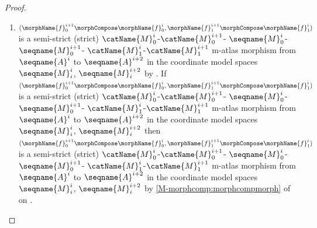 \documentclass{article}
\begin{document}
\begin{lemma}
\begin{proof}
\begin{enumerate}
\item
$
  (
    \morphName{f}^{i+1}_0 \morphCompose \morphName{f}^i_0,
    \morphName{f}^{i+1}_1 \morphCompose \morphName{f}^i_1
  )
$
is a semi-strict (strict)
$\catName{M}^i_0$-$\catName{M}^{i+1}_0$-%
$\seqname{M}^i_0$-$\seqname{M}^{i+1}_0$-%
$\catName{M}^i_1$-$\catName{M}^{i+1}_1$ m-atlas morphism from
$\seqname{A}^i$ to $\seqname{A}^{i+2}$ in the coordinate model spaces
$\seqname{M}^i_i$, $\seqname{M}^{i+2}_i$ by
.
If
$
  (
    \morphName{f}^{i+1}_0 \morphCompose \morphName{f}^i_0,
    \morphName{f}^{i+1}_1 \morphCompose \morphName{f}^i_1
  )
$
is a semi-strict (strict)
$\catName{M}^i_0$-$\catName{M}^{i+1}_0$-%
$\seqname{M}^i_0$-$\seqname{M}^{i+1}_0$-%
$\catName{M}^i_1$-$\catName{M}^{i+1}_1$
m-atlas morphism from $\seqname{A}^i$ to $\seqname{A}^{i+2}$ in the
coordinate model spaces $\seqname{M}^i_i$, $\seqname{M}^{i+2}_i$ then
$
  (
    \morphName{f}^{i+1}_0 \morphCompose \morphName{f}^i_0,
    \morphName{f}^{i+1}_1 \morphCompose \morphName{f}^i_1
  )
$
is a semi-strict (strict)
$\catName{M}^i_0$-$\catName{M}^{i+1}_0$-%
$\seqname{M}^i_0$-$\seqname{M}^{i+1}_0$-%
$\catName{M}^i_1$-$\catName{M}^{i+1}_1$
m-atlas morphism from $\seqname{A}^i$ to $\seqname{A}^{i+2}$ in the
coordinate model spaces $\seqname{M}^i_i$, $\seqname{M}^{i+2}_i$ by
\cref{M-morphcomp:morphcompmorph} of
{
  \showlabelsinline
   on
  .
}
\end{enumerate}
\end{proof}

\end{lemma}
\end{document}
